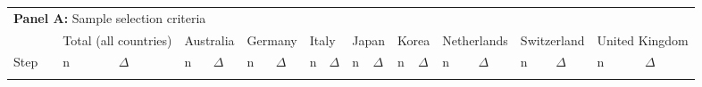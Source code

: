 \begin{tabular}{l>{\raggedright\arraybackslash}p{2.5in}llllllllllllllllll}
   \toprule 
 
\multicolumn{14}{l}{{\bf Panel A:} Sample selection criteria} \\ 

&  & 
\multicolumn{2}{l}{Total (all countries)} &
\multicolumn{2}{l}{Australia} &
\multicolumn{2}{l}{Germany} &
\multicolumn{2}{l}{Italy} &
\multicolumn{2}{l}{Japan} &
\multicolumn{2}{l}{Korea} &
\multicolumn{2}{l}{Netherlands} &
\multicolumn{2}{l}{Switzerland} &
\multicolumn{2}{l}{United Kingdom}
\\  
 
 
\multicolumn{1}{l}{Step} & 
\multicolumn{1}{l}{Description} 
& n & $\Delta$
& n & $\Delta$
& n & $\Delta$
& n & $\Delta$
& n & $\Delta$
& n & $\Delta$
& n & $\Delta$
& n & $\Delta$
& n & $\Delta$
\\ 
\cmidrule(lr){1-2}
\cmidrule(lr){3-4}
\cmidrule(lr){5-6}
\cmidrule(lr){7-8}
\cmidrule(lr){9-10}
\cmidrule(lr){11-12}
\cmidrule(lr){13-14}
\cmidrule(lr){15-16}
\cmidrule(lr){17-18}
\cmidrule(lr){19-20}
\\[-1.8ex]  
 

\end{tabular}
